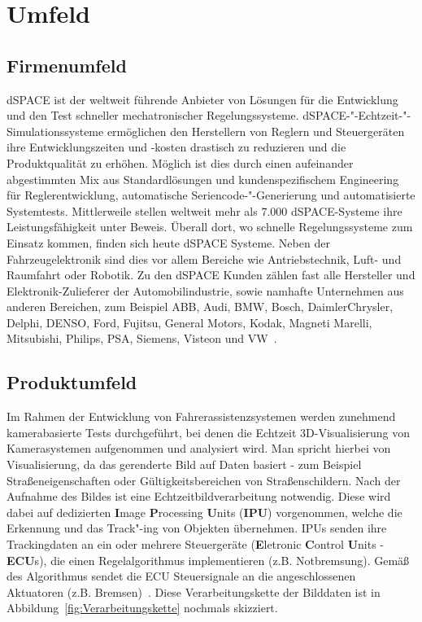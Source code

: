\chapter{Umfeld}
\section{Firmenumfeld}
dSPACE ist der weltweit f\"uhrende Anbieter von L\"osungen f\"ur die Entwicklung und den Test schneller mechatronischer Regelungssysteme. dSPACE-"-Echtzeit-"-Simulationssysteme  erm\"oglichen den Herstellern von Reglern und Steuerger\"aten ihre Entwicklungszeiten und -kosten drastisch zu reduzieren und die Produktqualit\"at zu erh\"ohen. M\"oglich ist dies durch einen aufeinander abgestimmten Mix aus Standardl\"osungen und kundenspezifischem Engineering f\"ur Reglerentwicklung, automatische Seriencode-"-Generierung und automatisierte Systemtests.
Mittlerweile stellen weltweit mehr als 7.000 dSPACE-Systeme ihre Leistungsf\"ahigkeit unter Beweis. \"Uberall dort, wo schnelle Regelungssysteme zum Einsatz kommen, finden sich heute dSPACE Systeme. Neben der Fahrzeugelektronik sind dies vor allem Bereiche wie Antriebstechnik, Luft- und Raumfahrt oder Robotik. Zu den dSPACE Kunden z\"ahlen fast alle Hersteller und Elektronik-Zulieferer der Automobilindustrie, sowie namhafte Unternehmen aus anderen Bereichen, zum Beispiel ABB, Audi, BMW, Bosch, DaimlerChrysler, Delphi, DENSO, Ford, Fujitsu, General Motors, Kodak, Magneti Marelli, Mitsubishi, Philips, PSA, Siemens, Visteon und VW~\cite{dSPACEGmbH.2014b}.

\section{Produktumfeld}
Im Rahmen der Entwicklung von Fahrerassistenzsystemen werden zunehmend kamerabasierte Tests durchgef\"uhrt, bei denen die Echtzeit 3D-Visualisierung von Kamerasystemen aufgenommen und analysiert wird.  Man spricht hierbei von Visualisierung, da das gerenderte Bild auf Daten basiert - zum Beispiel Stra\ss{}eneigenschaften oder G\"ultigkeitsbereichen von Stra\ss{}enschildern. Nach der Aufnahme des Bildes ist eine Echtzeitbildverarbeitung notwendig. Diese wird dabei auf dedizierten \textbf{I}mage \textbf{P}rocessing \textbf{U}nits (\textbf{IPU}) vorgenommen, welche die Erkennung und das Track"-ing von Objekten \"ubernehmen. IPUs senden ihre Trackingdaten an ein oder mehrere Steuerger\"ate (\textbf{E}letronic \textbf{C}ontrol \textbf{U}nits - \textbf{ECU}s), die einen Regelalgorithmus implementieren (z.B. Notbremsung). Gem\"a\ss{} des Algorithmus sendet die ECU Steuersignale an die angeschlossenen Aktuatoren (z.B. Bremsen)~\cite{Meyer.2012}. Diese Verarbeitungskette der Bilddaten ist in Abbildung~\ref{fig:Verarbeitungskette} nochmals skizziert.



